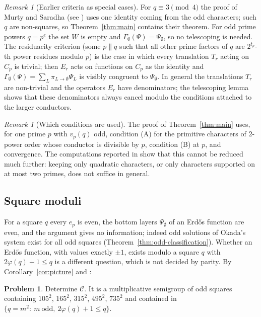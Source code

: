 \documentclass[11pt]{amsart}
\theoremstyle{definition}
\newtheorem{problem}[theorem]{Problem}
\theoremstyle{remark}
\newtheorem{remark}[theorem]{Remark}
\numberwithin{equation}{section}
\begin{document}
\begin{remark}[Earlier criteria as special cases]
For $q\equiv3\pmod4$ the proof of Murty and Saradha \cite{MS10} (see \cite[Prop.~4.4]{Kei26}) uses one identity coming from the odd characters; such $q$ are non-squares, so Theorem~\ref{thm:main} contains their theorem.
For odd prime powers $q=p^e$ the set $W$ is empty and $\Gamma_\emptyset(\Psi)=\Psi_\emptyset$, so no telescoping is needed.
The residuacity criterion \cite[Thm.~5.4]{Kei26} (some $p\parallel q$ such that all other prime factors of $q$ are $2^{t_p}$-th power residues modulo $p$) is the case in which every translation $T_r$ acting on $C_p$ is trivial; then $E_r$ acts on functions on $C_p$ as the identity and $\Gamma_\emptyset(\Psi)=\sum_L\pi_{L\to\emptyset}\Psi_L$ is visibly congruent to $\Psi_\emptyset$.
In general the translations $T_r$ are non-trivial and the operators $E_r$ have denominators; the telescoping lemma shows that these denominators always cancel modulo the conditions attached to the larger conductors.
\end{remark}

\begin{remark}[Which conditions are used]
The proof of Theorem~\ref{thm:main} uses, for one prime $p$ with $v_p(q)$ odd, condition (A) for the primitive characters of $2$-power order whose conductor is divisible by $p$, condition (B) at $p$, and convergence.
The computations reported in \cite[Sect.~6]{Kei26} show that this cannot be reduced much further: keeping only quadratic characters, or only characters supported on at most two primes, does not suffice in general.
\end{remark}

\subsection{Square moduli}
For a square $q$ every $e_p$ is even, the bottom layers $\Psi_\emptyset$ of an Erd\H{o}s function are even, and the argument gives no information; indeed odd solutions of Okada's system exist for all odd squares (Theorem~\ref{thm:odd-classification}).
Whether an Erd\H{o}s function, with values exactly $\pm1$, exists modulo a square $q$ with $2\varphi(q)+1\le q$ is a different question, which is not decided by parity.
By Corollary~\ref{cor:picture} and \cite{Kei26}:

\begin{problem}\label{prob:squares}
Determine $\mathcal C$.
It is a multiplicative semigroup of odd squares containing $105^2$, $165^2$, $315^2$, $495^2$, $735^2$ \cite[Thms.~3.1, 3.3, 3.4, 3.6]{Kei26} and contained in $\{q=m^2:\ m\ \text{odd},\ 2\varphi(q)+1\le q\}$.
\end{problem}
\end{document}
